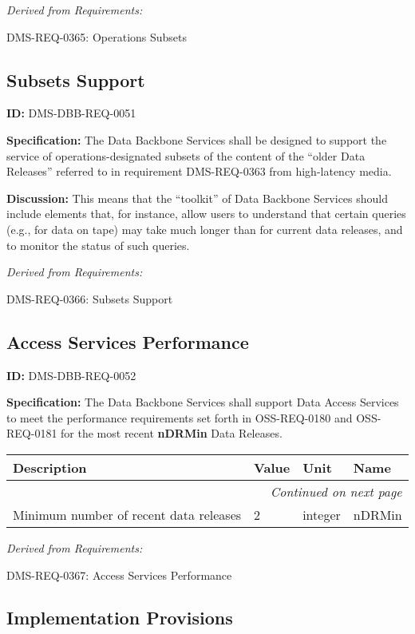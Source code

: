 \documentclass[SE,toc]{lsstdoc}
\makeatletter
\newcommand{\paramname}[1]{\hspace{0pt}#1}
\newcommand{\unitname}[1]{\hspace{0pt}#1}
\newenvironment{parameters}[0]{%
\setlength\LTleft{0pt}
\setlength\LTright{\fill}
\begin{small}
\begin{longtable}[]{|p{0.49\textwidth}|l|p{0.6in}|p{1.70in}@{}|}

\hline \textbf{Description} & \textbf{Value} & \textbf{Unit} & \textbf{Name} \\ \hline
\endhead

\hline \multicolumn{4}{r}{\emph{Continued on next page}} \\
\endfoot

\hline\hline
\endlastfoot
}{%
\hline
\end{longtable}
\end{small}
}
\makeatother
\begin{document}
\emph{Derived from Requirements:}

DMS-REQ-0365:
Operations Subsets \newline

\subsection{Subsets Support}

\label{DMS-DBB-REQ-0051}
\textbf{ID:} DMS-DBB-REQ-0051

\textbf{Specification:}
The Data Backbone Services shall be designed to support the service of operations-designated subsets of the content of the “older Data Releases” referred to in requirement DMS-REQ-0363 from high-latency media.

\textbf{Discussion:}
This means that the “toolkit” of Data Backbone Services should include elements that, for instance, allow users to understand that certain queries (e.g., for data on tape) may take much longer than for current data releases, and to monitor the status of such queries.

\emph{Derived from Requirements:}

DMS-REQ-0366:
Subsets Support \newline

\subsection{Access Services Performance}

\label{DMS-DBB-REQ-0052}
\textbf{ID:} DMS-DBB-REQ-0052

\textbf{Specification:}
The Data Backbone Services shall support Data Access Services to meet the performance requirements set forth in OSS-REQ-0180 and OSS-REQ-0181 for the most recent \textbf{nDRMin} Data Releases.

\begin{parameters}
Minimum number of recent data releases
&
2
&
\unitname{%
integer
}
&
\paramname{%
nDRMin
} \\\hline
\end{parameters}

\emph{Derived from Requirements:}

DMS-REQ-0367:
Access Services Performance \newline

\subsection{Implementation Provisions}
\end{document}
